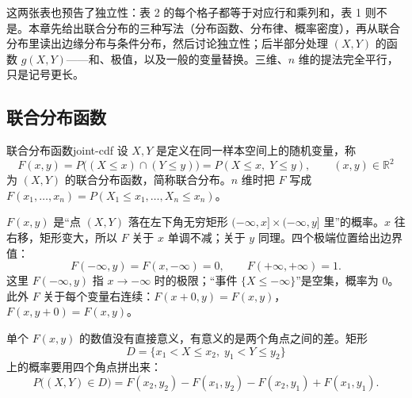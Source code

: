 这两张表也预告了独立性：表 2 的每个格子都等于对应行和乘列和，表 1 则不是。本章先给出联合分布的三种写法（分布函数、分布律、概率密度），再从联合分布里读出边缘分布与条件分布，然后讨论独立性；后半部分处理 $(X,Y)$ 的函数 $g(X,Y)$——和、极值，以及一般的变量替换。三维、$n$ 维的提法完全平行，只是记号更长。

\subsection{联合分布函数}

\begin{mydef}{联合分布函数}{joint-cdf}
设 $X,Y$ 是定义在同一样本空间上的随机变量，称
\[
F(x,y)=P\bigl((X\le x)\cap(Y\le y)\bigr)=P(X\le x,\;Y\le y),\qquad (x,y)\in\mathbb R^2
\]
为 $(X,Y)$ 的联合分布函数，简称联合分布。$n$ 维时把 $F$ 写成 $F(x_1,\dots,x_n)=P(X_1\le x_1,\dots,X_n\le x_n)$。
\end{mydef}

$F(x,y)$ 是“点 $(X,Y)$ 落在左下角无穷矩形 $(-\infty,x]\times(-\infty,y]$ 里”的概率。$x$ 往右移，矩形变大，所以 $F$ 关于 $x$ 单调不减；关于 $y$ 同理。四个极端位置给出边界值：
\[
F(-\infty,y)=F(x,-\infty)=0,\qquad F(+\infty,+\infty)=1 .
\]
这里 $F(-\infty,y)$ 指 $x\to-\infty$ 时的极限；“事件 $\{X\le -\infty\}$”是空集，概率为 $0$。此外 $F$ 关于每个变量右连续：$F(x+0,y)=F(x,y)$，$F(x,y+0)=F(x,y)$。

单个 $F(x,y)$ 的数值没有直接意义，有意义的是两个角点之间的差。矩形
\[
D=\{x_1<X\le x_2,\; y_1<Y\le y_2\}
\]
上的概率要用四个角点拼出来：
\[
P\bigl((X,Y)\in D\bigr)=F(x_2,y_2)-F(x_1,y_2)-F(x_2,y_1)+F(x_1,y_1).
\]

